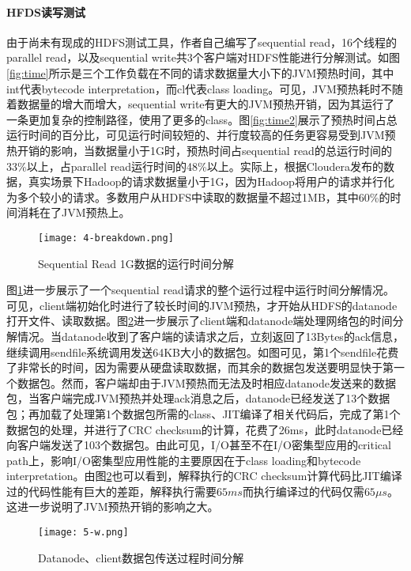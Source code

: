 \documentclass[lang=cn,12pt,a4paper,cite=authoryear]{elegantpaper}
\begin{document}
\paragraph{HFDS读写测试}
由于尚未有现成的HDFS测试工具，作者自己编写了sequential read，16个线程的parallel read，以及sequential write共3个客户端对HDFS性能进行分解测试。如图\ref{fig:time}所示是三个工作负载在不同的请求数据量大小下的JVM预热时间，其中int代表bytecode interpretation，而cl代表class loading。可见，JVM预热耗时不随着数据量的增大而增大，sequential write有更大的JVM预热开销，因为其运行了一条更加复杂的控制路径，使用了更多的class。图\ref{fig:time2}展示了预热时间占总运行时间的百分比，可见运行时间较短的、并行度较高的任务更容易受到JVM预热开销的影响，当数据量小于1G时，预热时间占sequential read的总运行时间的33\%以上，占parallel read运行时间的48\%以上。实际上，根据Cloudera发布的数据，真实场景下Hadoop的请求数据量小于1G，因为Hadoop将用户的请求并行化为多个较小的请求。多数用户从HDFS中读取的数据量不超过1MB，其中60\%的时间消耗在了JVM预热上。

\begin{figure}[!htp]
  \centering
  \texttt{[image: 4-breakdown.png]}
  \caption{Sequential Read 1G数据的运行时间分解}
  \label{fig:br}
\end{figure}

图\ref{fig:br}进一步展示了一个sequential read请求的整个运行过程中运行时间分解情况。可见，client端初始化时进行了较长时间的JVM预热，才开始从HDFS的datanode打开文件、读取数据。图\ref{fig:br1}进一步展示了client端和datanode端处理网络包的时间分解情况。当datanode收到了客户端的读请求之后，立刻返回了13Bytes的ack信息，继续调用sendfile系统调用发送64KB大小的数据包。如图可见，第1个sendfile花费了非常长的时间，因为需要从硬盘读取数据，而其余的数据包发送要明显快于第一个数据包。然而，客户端却由于JVM预热而无法及时相应datanode发送来的数据包，当客户端完成JVM预热并处理ack消息之后，datanode已经发送了13个数据包；再加载了处理第1个数据包所需的class、JIT编译了相关代码后，完成了第1个数据包的处理，并进行了CRC checksum的计算，花费了26ms，此时datanode已经向客户端发送了103个数据包。由此可见，I/O甚至不在I/O密集型应用的critical path上，影响I/O密集型应用性能的主要原因在于class loading和bytecode interpretation。由图\ref{fig:br1}也可以看到，解释执行的CRC checksum计算代码比JIT编译过的代码性能有巨大的差距，解释执行需要$65ms$而执行编译过的代码仅需$65\mu s$。这进一步说明了JVM预热开销的影响之大。

\begin{figure}[!htp]
  \centering
  \texttt{[image: 5-w.png]}
  \caption{Datanode、client数据包传送过程时间分解}
  \label{fig:br1}
\end{figure}
\end{document}
